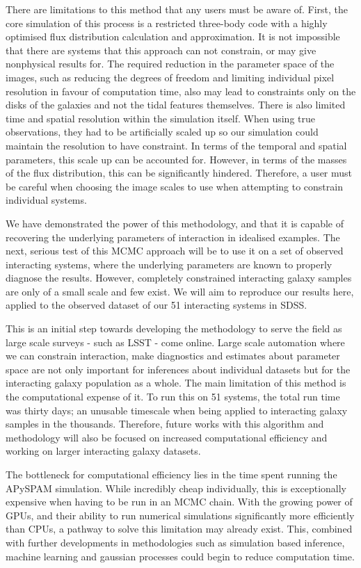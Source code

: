 There are limitations to this method that any users must be aware of. First, the core simulation of this process is a restricted three-body code with a highly optimised flux distribution calculation and approximation. It is not impossible that there are systems that this approach can not constrain, or may give nonphysical results for. The required reduction in the parameter space of the images, such as reducing the degrees of freedom and limiting individual pixel resolution in favour of computation time, also may lead to constraints only on the disks of the galaxies and not the tidal features themselves. There is also limited time and spatial resolution within the simulation itself. When using true observations, they had to be artificially scaled up so our simulation could maintain the resolution to have constraint. In terms of the temporal and spatial parameters, this scale up can be accounted for. However, in terms of the masses of the flux distribution, this can be significantly hindered. Therefore, a user must be careful when choosing the image scales to use when attempting to constrain individual systems. 

We have demonstrated the power of this methodology, and that it is capable of recovering the underlying parameters of interaction in idealised examples. The next, serious test of this MCMC approach will be to use it on a set of observed interacting systems, where the underlying parameters are known to properly diagnose the results. However, completely constrained interacting galaxy samples are only of a small scale and few exist. We will aim to reproduce our results here, applied to the observed dataset of our 51 interacting systems in SDSS.

This is an initial step towards developing the methodology to serve the field as large scale surveys - such as LSST - come online. Large scale automation where we can constrain interaction, make diagnostics and estimates about parameter space are not only important for inferences about individual datasets but for the interacting galaxy population as a whole. The main limitation of this method is the computational expense of it. To run this on 51 systems, the total run time was thirty days; an unusable timescale when being applied to interacting galaxy samples in the thousands. Therefore, future works with this algorithm and methodology will also be focused on increased computational efficiency and working on larger interacting galaxy datasets. 

The bottleneck for computational efficiency lies in the time spent running the APySPAM simulation. While incredibly cheap individually, this is exceptionally expensive when having to be run in an MCMC chain. With the growing power of GPUs, and their ability to run numerical simulations significantly more efficiently than CPUs, a pathway to solve this limitation may already exist. This, combined with further developments in methodologies such as simulation based inference, machine learning and gaussian processes could begin to reduce computation time.